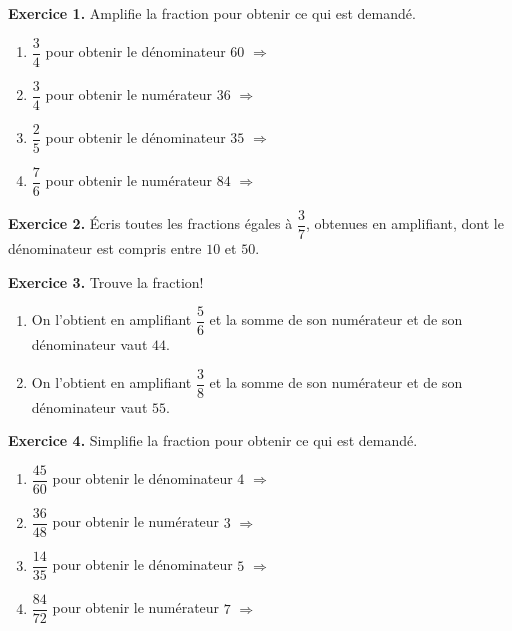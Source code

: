 


\def\x{1.3cm}
\def\arraystretch{2.2}
\vfill
{\bfseries\color{themeColor}Exercice 1.} Amplifie la fraction pour obtenir ce qui est demandé.

\begin{enumerate}[leftmargin=*,align=parleft, label=\alph*), itemsep=9pt]
\item $\dfrac{3}{4}$ pour obtenir le dénominateur $60$ \quad $\Longrightarrow$
\item $\dfrac{3}{4}$ pour obtenir le numérateur $36$ \quad $\Longrightarrow$
\item $\dfrac{2}{5}$ pour obtenir le dénominateur $35$ \quad $\Longrightarrow$
\item $\dfrac{7}{6}$ pour obtenir le numérateur $84$ \quad $\Longrightarrow$
\end{enumerate}

\vfill
{\bfseries\color{themeColor}Exercice 2.} Écris toutes les fractions égales à $\dfrac{3}{7}$, obtenues en amplifiant, dont le dénominateur est compris entre $10$ et $50$.

\vspace{100pt}

\vfill
{\bfseries\color{themeColor}Exercice 3.} Trouve la fraction!

\begin{enumerate}[leftmargin=*,align=parleft, label=\alph*), itemsep=50pt]
\item On l'obtient en amplifiant $\dfrac{5}{6}$ et la somme de son numérateur et de son dénominateur vaut $44$.
\item On l'obtient en amplifiant $\dfrac{3}{8}$ et la somme de son numérateur et de son dénominateur vaut $55$.
\end{enumerate} 

\vfill
\newpage


{\bfseries\color{themeColor}Exercice 4.} Simplifie la fraction pour obtenir ce qui est demandé.
 
\begin{enumerate}[leftmargin=*,align=parleft, label=\alph*), itemsep=9pt]
\item $\dfrac{45}{60}$ pour obtenir le dénominateur $4$ \quad $\Longrightarrow$
\item $\dfrac{36}{48}$ pour obtenir le numérateur $3$ \quad $\Longrightarrow$
\item $\dfrac{14}{35}$ pour obtenir le dénominateur $5$ \quad $\Longrightarrow$
\item $\dfrac{84}{72}$ pour obtenir le numérateur $7$ \quad $\Longrightarrow$
\end{enumerate}

